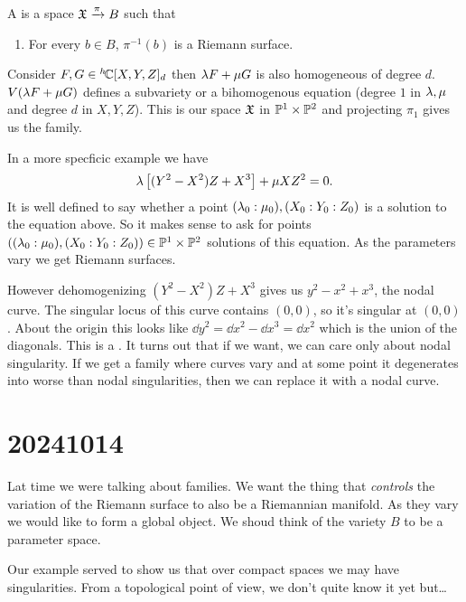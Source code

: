 \documentclass[12pt]{memoir}
\begin{document}
\begin{Def}
A  is a space $\mathfrak{X}\xrightarrow{\pi}B$ such that
\begin{enumerate}
    \item For every $b\in B$, $\pi^{-1}(b)$ is a Riemann surface.
\end{enumerate}
\end{Def}

\begin{Ex}
    Consider $F,G\in{}^{h\!}\mathbb{C}[X,Y,Z]_d$ then $\lambda F+\mu G$ is also homogeneous of degree $d$. $V(\lambda F+\mu G)$ defines a subvariety or a bihomogenous equation (degree $1$ in $\lambda,\mu$ and degree $d$ in $X,Y,Z$). This is our space $\mathfrak{X}$ in $\mathbb{P}^1\times\mathbb{P}^2$ and projecting $\pi_1$ gives us the family.
\end{Ex}

\begin{Ex}
    In a more specficic example we have 
    $$\lambda\left\lbrack(Y^2-X^2)Z+X^3\right\rbrack+\mu XZ^2=0.$$
    It is well defined to say whether a point $(\lambda_0:\mu_0),(X_0:Y_0:Z_0)$ is a solution to the equation above. So it makes sense to ask for points $((\lambda_0:\mu_0),(X_0:Y_0:Z_0))\in\mathbb{P}^1\times\mathbb{P}^2$ solutions of this equation. As the parameters vary we get Riemann surfaces.\par
    However dehomogenizing $(Y^2-X^2)Z+X^3$ gives us $y^2-x^2+x^3$, the nodal curve. The singular locus of this curve contains $(0,0)$, so it's singular at $(0,0)$. About the origin this looks like $\dd y^2=\dd x^2-\dd x^3=\dd x^2$ which is the union of the diagonals. This is a . It turns out that if we want, we can care only about nodal singularity. If we get a family where curves vary and at some point it degenerates into worse than nodal singularities, then we can replace it with a nodal curve.
\end{Ex}

\section{20241014}

Lat time we were talking about families. We want the thing that \emph{controls} the variation of the Riemann surface to also be a Riemannian manifold. As they vary we would like to form a global object. We shoud think of the variety $B$ to be a parameter space.\par
Our example served to show us that over compact spaces we may have singularities. From a topological point of view, we don't quite know it yet but\dots
\end{document}
